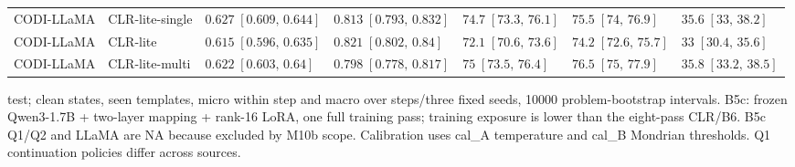 \begin{table}[t]
{\begin{tabular}{lllllll}
CODI-LLaMA & CLR-lite-single & $0.627\;[0.609,\,0.644]$ & $0.813\;[0.793,\,0.832]$ & $74.7\;[73.3,\,76.1]$ & $75.5\;[74,\,76.9]$ & $35.6\;[33,\,38.2]$ \\
CODI-LLaMA & CLR-lite & $0.615\;[0.596,\,0.635]$ & $0.821\;[0.802,\,0.84]$ & $72.1\;[70.6,\,73.6]$ & $74.2\;[72.6,\,75.7]$ & $33\;[30.4,\,35.6]$ \\
CODI-LLaMA & CLR-lite-multi & $0.622\;[0.603,\,0.64]$ & $0.798\;[0.778,\,0.817]$ & $75\;[73.5,\,76.4]$ & $76.5\;[75,\,77.9]$ & $35.8\;[33.2,\,38.5]$ \\
\bottomrule
\end{tabular}}
\par\smallskip\parbox{\textwidth}{\scriptsize test; clean states, seen templates, micro within step and macro over steps/three fixed seeds, 10000 problem-bootstrap intervals. B5c: frozen Qwen3-1.7B + two-layer mapping + rank-16 LoRA, one full training pass; training exposure is lower than the eight-pass CLR/B6. B5c Q1/Q2 and LLaMA are NA because excluded by M10b scope. Calibration uses cal\_A temperature and cal\_B Mondrian thresholds. Q1 continuation policies differ across sources.}
\end{table}
